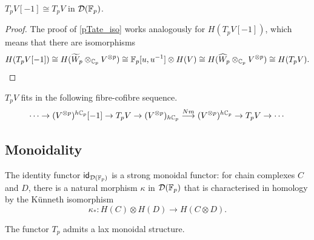 \begin{lemma}\label{fibre_cofibre}
	\(T_pV[-1] \cong T_pV\) in \(\mathcal{D}({\mathbb{F}_p})\).
\end{lemma}

\begin{proof}
	The proof of \cref{pTate_iso} works analogously for \(H(T_pV[-1])\), which means that there are isomorphisms
	\[
	H(T_pV[-1]) \cong H(\widetilde W_p \otimes_{\mathbb{C}_p} V^{\otimes p}) \cong {\mathbb{F}_p}[u,u^{-1}] \otimes H(V) \cong H(\widehat W_p \otimes_{\mathbb{C}_p} V^{\otimes p}) \cong H(T_pV).
	\]
\end{proof}

\begin{corollary}
	\(T_pV\) fits in the following fibre-cofibre sequence. %
	\[
	\cdots \to (V^{\otimes p})^{h\mathbb{C}_p}[-1] \to T_pV \to (V^{\otimes p})_{h\mathbb{C}_p} \overset{Nm}\longrightarrow (V^{\otimes p})^{h\mathbb{C}_p} \to T_pV \to \cdots
	\]
\end{corollary}

\subsection{Monoidality}

The identity functor \(\mathsf{id}_{\mathcal{D}({\mathbb{F}_p})}\) is a strong monoidal functor: for chain complexes \(C\) and \(D\), there is a natural morphism \(\kappa\) in \(\mathcal{D}({\mathbb{F}_p})\) that is characterised in homology by the Künneth isomorphism 
\[
\kappa_* \colon H(C) \otimes H(D) \longrightarrow H(C \otimes D).
\]

\begin{proposition}
	The functor \(T_p\) admits a lax monoidal structure.
\end{proposition}

